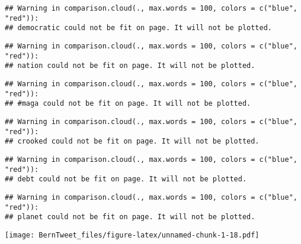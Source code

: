 \documentclass[]{article}
\begin{document}
\begin{verbatim}
## Warning in comparison.cloud(., max.words = 100, colors = c("blue", "red")):
## democratic could not be fit on page. It will not be plotted.
\end{verbatim}

\begin{verbatim}
## Warning in comparison.cloud(., max.words = 100, colors = c("blue", "red")):
## nation could not be fit on page. It will not be plotted.
\end{verbatim}

\begin{verbatim}
## Warning in comparison.cloud(., max.words = 100, colors = c("blue", "red")):
## #maga could not be fit on page. It will not be plotted.
\end{verbatim}

\begin{verbatim}
## Warning in comparison.cloud(., max.words = 100, colors = c("blue", "red")):
## crooked could not be fit on page. It will not be plotted.
\end{verbatim}

\begin{verbatim}
## Warning in comparison.cloud(., max.words = 100, colors = c("blue", "red")):
## debt could not be fit on page. It will not be plotted.
\end{verbatim}

\begin{verbatim}
## Warning in comparison.cloud(., max.words = 100, colors = c("blue", "red")):
## planet could not be fit on page. It will not be plotted.
\end{verbatim}

\texttt{[image: BernTweet\_files/figure-latex/unnamed-chunk-1-18.pdf]}
\end{document}
